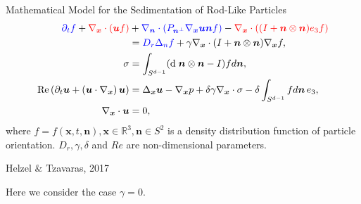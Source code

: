 \begin{frame}{Mathematical Model for the Sedimentation of Rod-Like Particles}
	\scriptsize
{}
\begin{align*}
	\textcolor{blue}{\partial_t f}+ \textcolor{red}{\nabla_{\boldsymbol{x}} \cdot(\boldsymbol{u} f)} & +\textcolor{blue}{\nabla_{\boldsymbol{n}} \cdot\left(P_{\boldsymbol{n}^{\perp}} \nabla_{\boldsymbol{x}} \boldsymbol{u} \boldsymbol{n} f\right)}- \textcolor{red}{\nabla_{\boldsymbol{x}} \cdot\left((I+\boldsymbol{n} \otimes \boldsymbol{n}) e_3 f\right)} \\
	& =\textcolor{blue}{D_r \Delta_n f}+\gamma \nabla_{\boldsymbol{x}} \notag \cdot(I+\boldsymbol{n} \otimes \boldsymbol{n}) \nabla_{\boldsymbol{x}} f, \\
	\sigma & =\int_{S^{d-1}}(\text{d} \; \boldsymbol{n} \otimes \boldsymbol{n}-I) f d \boldsymbol{n},  \\
	\operatorname{Re}\left(\partial_t \boldsymbol{u}+\left(\boldsymbol{u} \cdot \nabla_{\boldsymbol{x}}\right) \boldsymbol{u}\right) & =\Delta_{\boldsymbol{x}} \boldsymbol{u}-\nabla_{\boldsymbol{x}} p+\delta \gamma \nabla_{\boldsymbol{x}} \cdot \sigma-\delta \int_{S^{d-1}} f d \boldsymbol{n} \, e_3, \\
	\nabla_{\boldsymbol{x}} \cdot \boldsymbol{u} & =0,
\end{align*}
where $f = f(\boldsymbol{x}, t, \boldsymbol{n}), \boldsymbol{x} \in \mathbb{R}^3 , \boldsymbol{n} \in  S^2$ is a density distribution function of particle orientation. $D_r, \gamma, \delta$ and $Re$ are non-dimensional parameters.
\begin{beamercolorbox}[sep=1em,wd=\linewidth,right]{}
	\tiny{Helzel $\&$ Tzavaras, 2017}
\end{beamercolorbox}
Here we consider the case $\gamma = 0$.
\end{frame}


